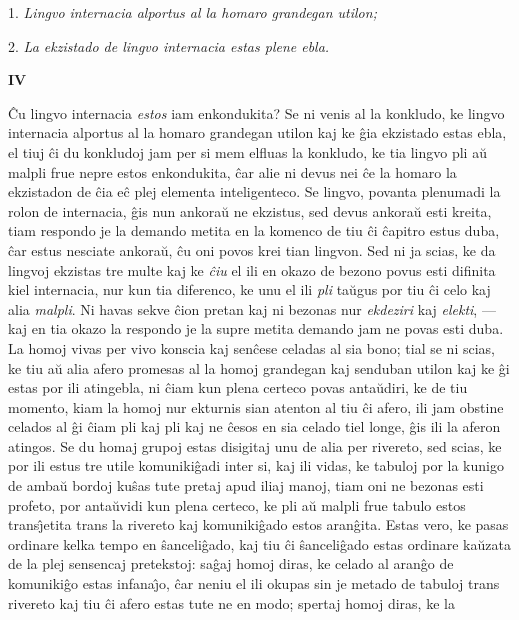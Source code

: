 1. \emph{Lingvo internacia alportus al la homaro grandegan utilon;}

2. \emph{La ekzistado de lingvo internacia estas plene ebla.}

\begin{center}
\textbf{IV}
\end{center}

   \^Cu lingvo internacia {\sl estos} iam enkondukita? Se ni venis al la
konkludo, ke lingvo internacia alportus al la homaro grandegan
utilon kaj ke \^gia ekzistado estas ebla, el tiuj \^ci du konkludoj
jam per si mem elfluas la konkludo, ke tia lingvo pli a\u u malpli
frue nepre estos enkondukita, \^car alie ni devus nei \^ce la homaro
la ekzistadon de \^cia e\^c plej elementa inteligenteco. Se lingvo,
povanta plenumadi la rolon de internacia, \^gis nun ankora\u u ne
ekzistus, sed devus ankora\u u esti kreita, tiam respondo je la
demando metita en la komenco de tiu \^ci \^capitro estus duba, \^car
estus nesciate ankora\u u, \^cu oni povos krei tian lingvon. Sed ni
ja scias, ke da lingvoj ekzistas tre multe kaj ke {\sl \^ciu} el ili
en okazo de bezono povus esti difinita kiel internacia, nur kun tia
diferenco, ke unu el ili {\sl pli} ta\u ugus por tiu \^ci celo kaj
alia {\sl malpli}. Ni havas sekve \^cion pretan kaj ni bezonas nur
{\sl ekdeziri} kaj {\sl elekti}, --- kaj en tia okazo la respondo je
la supre metita demando jam ne povas esti duba. La homoj vivas per
vivo konscia kaj sen\^cese celadas al sia bono; tial se ni scias, ke
tiu a\u u alia afero promesas al la homoj grandegan kaj senduban
utilon kaj ke \^gi estas por ili atingebla, ni \^ciam kun plena
certeco povas anta\u udiri, ke de tiu momento, kiam la homoj nur
ekturnis sian atenton al tiu \^ci afero, ili jam obstine celados al
\^gi \^ciam pli kaj pli kaj ne \^cesos en sia celado tiel longe,
\^gis ili la aferon atingos. Se du homaj grupoj estas disigitaj unu
de alia per rivereto, sed scias, ke por ili estus tre utile
komuniki\^gadi inter si, kaj ili vidas, ke tabuloj por la kunigo de
amba\u u bordoj ku\^sas tute pretaj apud iliaj manoj, tiam oni ne
bezonas esti profeto, por anta\u uvidi kun plena certeco, ke pli a\u
u malpli frue tabulo estos trans\^{\j}etita trans la rivereto kaj
komuniki\^gado estos aran\^gita. Estas vero, ke pasas ordinare kelka
tempo en \^sanceli\^gado, kaj tiu \^ci \^sanceli\^gado estas
ordinare ka\u uzata de la plej sensencaj pretekstoj: sa\^gaj homoj
diras, ke celado al aran\^go de komuniki\^go estas infana\^{\j}o,
\^car neniu el ili okupas sin je metado de tabuloj trans rivereto
kaj tiu \^ci afero estas tute ne en modo; spertaj homoj diras, ke la
